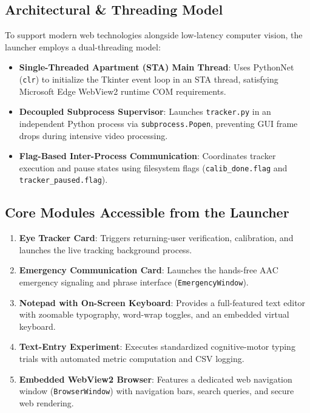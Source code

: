 \documentclass[11pt,a4paper]{article}
\begin{document}
\subsection{Architectural \& Threading Model}
To support modern web technologies alongside low-latency computer vision, the launcher employs a dual-threading model:
\begin{itemize}
    \item \textbf{Single-Threaded Apartment (STA) Main Thread}: Uses PythonNet (\texttt{clr}) to initialize the Tkinter event loop in an STA thread, satisfying Microsoft Edge WebView2 runtime COM requirements.
    \item \textbf{Decoupled Subprocess Supervisor}: Launches \texttt{tracker.py} in an independent Python process via \texttt{subprocess.Popen}, preventing GUI frame drops during intensive video processing.
    \item \textbf{Flag-Based Inter-Process Communication}: Coordinates tracker execution and pause states using filesystem flags (\texttt{calib\_done.flag} and \texttt{tracker\_paused.flag}).
\end{itemize}

\subsection{Core Modules Accessible from the Launcher}
\begin{enumerate}
    \item \textbf{Eye Tracker Card}: Triggers returning-user verification, calibration, and launches the live tracking background process.
    \item \textbf{Emergency Communication Card}: Launches the hands-free AAC emergency signaling and phrase interface (\texttt{EmergencyWindow}).
    \item \textbf{Notepad with On-Screen Keyboard}: Provides a full-featured text editor with zoomable typography, word-wrap toggles, and an embedded virtual keyboard.
    \item \textbf{Text-Entry Experiment}: Executes standardized cognitive-motor typing trials with automated metric computation and CSV logging.
    \item \textbf{Embedded WebView2 Browser}: Features a dedicated web navigation window (\texttt{BrowserWindow}) with navigation bars, search queries, and secure web rendering.
\end{enumerate}

\end{document}
